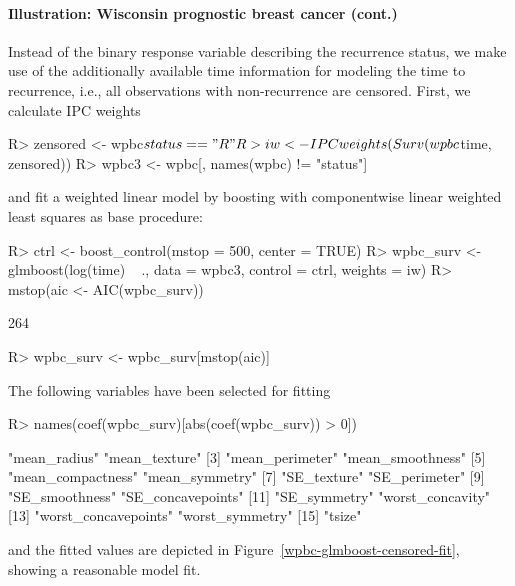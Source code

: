 \documentclass{article}
\newenvironment{Schunk}{}{}
\begin{document}
\paragraph{Illustration: Wisconsin prognostic breast cancer (cont.)}         


Instead of the binary response variable describing the recurrence status, we
make use of the additionally available time information for modeling
the time to recurrence, i.e., all observations with non-recurrence are censored.
First, we calculate IPC weights 
\begin{Schunk}
\begin{Sinput}
R> zensored <- wpbc$status == "R"
R> iw <- IPCweights(Surv(wpbc$time, zensored))
R> wpbc3 <- wpbc[, names(wpbc) != "status"]
\end{Sinput}
\end{Schunk}
and fit a weighted linear model by boosting with componentwise linear
weighted least squares as base procedure: 
\begin{Schunk}
\begin{Sinput}
R> ctrl <- boost_control(mstop = 500, center = TRUE)
R> wpbc_surv <- glmboost(log(time) ~ ., data = wpbc3, 
         control = ctrl, weights = iw)
R> mstop(aic <- AIC(wpbc_surv))
\end{Sinput}
\begin{Soutput}
[1] 264
\end{Soutput}
\begin{Sinput}
R> wpbc_surv <- wpbc_surv[mstop(aic)]
\end{Sinput}
\end{Schunk}
The following variables have been selected for fitting 
\begin{Schunk}
\begin{Sinput}
R> names(coef(wpbc_surv)[abs(coef(wpbc_surv)) > 0])
\end{Sinput}
\begin{Soutput}
 [1] "mean_radius"         "mean_texture"       
 [3] "mean_perimeter"      "mean_smoothness"    
 [5] "mean_compactness"    "mean_symmetry"      
 [7] "SE_texture"          "SE_perimeter"       
 [9] "SE_smoothness"       "SE_concavepoints"   
[11] "SE_symmetry"         "worst_concavity"    
[13] "worst_concavepoints" "worst_symmetry"     
[15] "tsize"              
\end{Soutput}
\end{Schunk}
and the fitted values are 
depicted in Figure~\ref{wpbc-glmboost-censored-fit}, showing a reasonable model fit.
\end{document}
